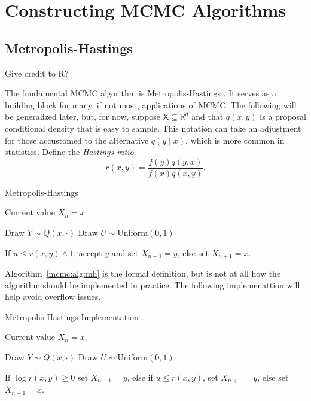 \documentclass[12pt]{article}
\theoremstyle{plain}
\theoremstyle{definition}
\theoremstyle{remark}
\newcommand{\X}{\mathsf{X}}
\newcommand{\real}{\mathbb{R}}
\begin{document}
 
 
\section{Constructing MCMC Algorithms}
\label{mcmc:sec:construct}

\subsection{Metropolis-Hastings}
\label{mcmc:sec:mh}

{\color{blue} Give credit to R?}

The fundamental MCMC algorithm is Metropolis-Hastings \cite{hast:1970,
  metr:1953}.  It serves as a building block for many, if not most,
applications of MCMC.  The following will be generalized later, but,
for now, suppose $\X \subseteq \real^d$ and that $q(x,y)$ is a
proposal conditional density that is easy to sample.  This notation can take an
adjustment for those accustomed to the alternative $q(y \mid x)$, which is more
common in statistics.  Define the {\em Hastings ratio}
\[
r(x,y) = \frac{f(y)q(y,x)}{f(x)q(x, y)} .
\]

\begin{algorithm}[H]
 \caption{Metropolis-Hastings} \label{mcmc:alg:mh}
 \begin{algorithmic}[1]
    Current value $X_n = x$.

   \State Draw $Y \sim Q(x, \cdot)$ \State Draw
   $U \sim \text{Uniform}(0,1)$
   
   \State If $u \le r(x,y) \wedge 1$, accept $y$ and set $X_{n+1}= y$,
   else set $X_{n+1} = x$.
 \end{algorithmic}
\end{algorithm}

Algorithm~\ref{mcmc:alg:mh} is the formal definition, but is not at
all how the algorithm should be implemented in practice.  The
following implemenattion will help avoid overflow issues.

\begin{algorithm}[H]
 \caption{Metropolis-Hastings Implementation} \label{mcmc:alg:mh}
 \begin{algorithmic}[1]
    Current value $X_n = x$.

   \State Draw $Y \sim Q(x, \cdot)$ \State Draw
   $U \sim \text{Uniform}(0,1)$

   \State If $\log r(x,y) \ge 0$ set $X_{n+1}= y$, else if $u \le
   r(x,y)$, set $X_{n+1}= y$, else set $X_{n+1} = x$.
 \end{algorithmic}
\end{algorithm}
\end{document}
